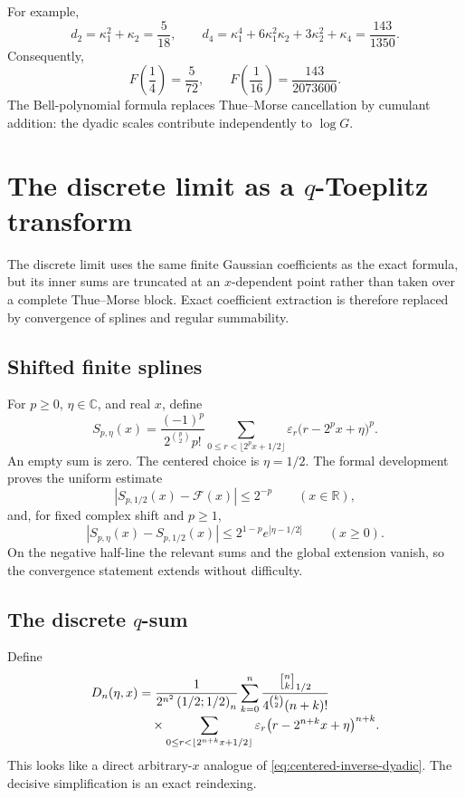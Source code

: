 \documentclass[11pt,oneside]{article}
\theoremstyle{definition}
\theoremstyle{remark}
\newcommand{\R}{\mathbb R}
\newcommand{\C}{\mathbb C}
\newcommand{\eps}{\varepsilon}
\newcommand{\poch}[3]{\left(#1;#2\right)_{#3}}
\newcommand{\qbinom}[3]{\genfrac{[}{]}{0pt}{}{#1}{#2}_{#3}}
\newcommand{\Fglobal}{\mathcal F}
\begin{document}
For example,
\[
 d_2=\kappa_1^2+\kappa_2=\frac5{18},
 \qquad
 d_4=\kappa_1^4+6\kappa_1^2\kappa_2+3\kappa_2^2+\kappa_4
 =\frac{143}{1350}.
\]
Consequently,
\[
 F\!\left(\frac14\right)=\frac5{72},
 \qquad
 F\!\left(\frac1{16}\right)=\frac{143}{2073600}.
\]
The Bell-polynomial formula replaces Thue--Morse cancellation by cumulant
addition: the dyadic scales contribute independently to $\log G$.

\section{The discrete limit as a $q$-Toeplitz transform}

The discrete limit uses the same finite Gaussian coefficients as the exact
formula, but its inner sums are truncated at an $x$-dependent point rather
than taken over a complete Thue--Morse block.  Exact coefficient extraction is
therefore replaced by convergence of splines and regular summability.

\subsection{Shifted finite splines}

For $p\ge0$, $\eta\in\C$, and real $x$, define
\begin{equation}\label{eq:shifted-spline}
 S_{p,\eta}(x)=
 \frac{(-1)^p}{2^{\binom p2}p!}
 \sum_{0\le r<\lfloor2^px+1/2\rfloor}
 \eps_r\bigl(r-2^px+\eta\bigr)^p.
\end{equation}
An empty sum is zero.  The centered choice is $\eta=1/2$.
The formal development proves the uniform estimate
\begin{equation}\label{eq:centered-spline-error}
 |S_{p,1/2}(x)-\Fglobal(x)|\le2^{-p}
 \qquad(x\in\R),
\end{equation}
and, for fixed complex shift and $p\ge1$,
\begin{equation}\label{eq:shift-spline-error}
 |S_{p,\eta}(x)-S_{p,1/2}(x)|
 \le2^{1-p}e^{|\eta-1/2|}
 \qquad(x\ge0).
\end{equation}
On the negative half-line the relevant sums and the global extension vanish,
so the convergence statement extends without difficulty.

\subsection{The discrete $q$-sum}

Define
\begin{align}\label{eq:Dn-definition}
 D_n(\eta,x)
 &=\frac1{2^{n^2}\poch{1/2}{1/2}{n}}
 \sum_{k=0}^{n}
 \frac{\qbinom{n}{k}{1/2}}
 {4^{\binom k2}(n+k)!}
 \notag\\[-0.25em]
 &\quad\times
 \sum_{0\le r<\lfloor2^{n+k}x+1/2\rfloor}
 \eps_r\bigl(r-2^{n+k}x+\eta\bigr)^{n+k}.
\end{align}
This looks like a direct arbitrary-$x$ analogue of
\eqref{eq:centered-inverse-dyadic}.  The decisive simplification is an exact
reindexing.
\end{document}
